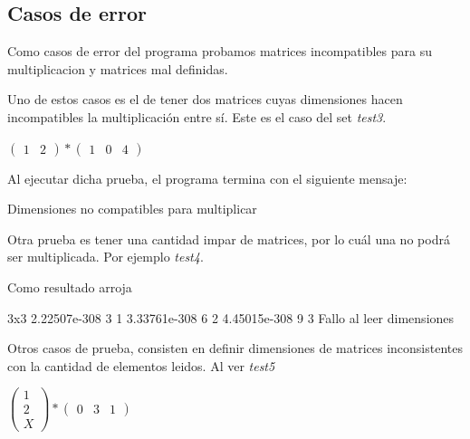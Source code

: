 \documentclass[10pt,a4paper]{article}
\begin{document}
	\subsection{Casos de error}
		Como casos de error del programa probamos matrices incompatibles para su multiplicacion y matrices mal definidas.

		Uno de estos casos es el de tener dos matrices cuyas dimensiones hacen incompatibles la multiplicación entre sí. Este es el caso del set \textit{test3}.

		
		\begin{center}
		$\begin{pmatrix}
		1 & 2
		\end{pmatrix}
		*
		\begin{pmatrix}
		1 & 0 & 4
		\end{pmatrix}
		$\end{center}

		Al ejecutar dicha prueba, el programa termina con el siguiente mensaje:

		\begin{bash}
		Dimensiones no compatibles para multiplicar
		\end{bash}

		Otra prueba es tener una cantidad impar de matrices, por lo cuál una no podrá ser multiplicada. Por ejemplo \textit{test4}.

		
		
		Como resultado arroja

		\begin{bash}
		3x3 2.22507e-308 3 1 3.33761e-308 6 2 4.45015e-308 9 3
		Fallo al leer dimensiones
		\end{bash}

		Otros casos de prueba, consisten en definir dimensiones de matrices inconsistentes con la cantidad de elementos leidos. Al ver \textit{test5}

		

		\begin{center}
		$\begin{pmatrix}
		1 \\ 2 \\ X
		\end{pmatrix}
		*
		\begin{pmatrix}
		0 & 3 & 1
		\end{pmatrix}
		$\end{center}
\end{document}

